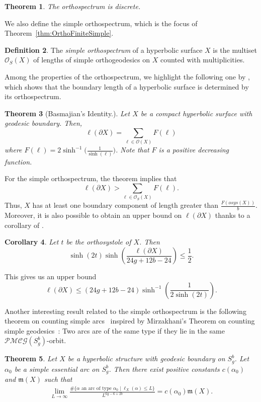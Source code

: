\documentclass[a4paper,12pt]{article}
\newtheorem{theorem}{Theorem}[section]
\newtheorem{corollaire}[theorem]{Corollary}
\theoremstyle{definition}
\newtheorem{definition}[theorem]{Definition}
\theoremstyle{remark}
\begin{document}
\begin{theorem}\label{thm:OrthoDiscrete}
    The orthospectrum is discrete.
\end{theorem}

We also define the simple orthospectrum, which is the focus of Theorem~\ref{thm:OrthoFiniteSimple}.

\begin{definition}
    The \emph{simple orthospectrum} of a hyperbolic surface $X$ is the multiset $\mathcal{O}_S(X)$ of lengths of simple orthogeodesics on $X$ counted with multiplicities.
\end{definition}



Among the properties of the orthospectrum, we highlight the following one by \cite{Basmajian}, which shows that the boundary length of a hyperbolic surface is determined by its orthospectrum. 

\begin{theorem}[Basmajian's Identity.]\label{theorem:perimetre}
    Let $X$ be a compact hyperbolic surface with geodesic boundary. Then,
    \[
        \ell (\partial X) = \sum_{\ell \in \mathcal{O}(X)} F(\ell)
    \]
    where $F(\ell)=2\sinh^{-1} \big( \frac{1}{\sinh (\ell)} \big)$. Note that $F$ is a positive decreasing function.
\end{theorem}

For the simple orthospectrum, the theorem implies that 
\[
    \ell (\partial X) > \sum_{\ell \in \mathcal{O}_S(X)} F(\ell).
\]
Thus, $X$ has at least one boundary component of length greater than $ \frac{F(osys(X))}{b}$. Moreover, it is also possible to obtain an upper bound on $\ell (\partial X)$ thanks to a corollary of \cite[Théorème~1]{Bavard}.

\begin{corollaire}\label{col:bavard}
    Let $t$ be the orthosystole of $X$. Then
    \[
        \sinh(2t)\sinh\left( \frac{\ell(\partial X)}{24g+12b-24}\right) \leqslant \frac{1}{2}.
    \]
    
\end{corollaire}
This gives us an upper bound
\[
    \ell(\partial X ) \leqslant (24g+12b-24) \sinh^{-1}\left( \frac{1}{2\sinh(2t)} \right).
\]

Another interesting result related to the simple orthospectrum is the following theorem on counting simple arcs~\cite{nickBell} inspired by Mirzakhani's Theorem on counting simple geodesics~\cite{mirzakhani}:
Two arcs are of the same type if they lie in the same $\mathcal{PMCG}(S_g^b)$-orbit.
\begin{theorem}\label{thm:comptageArc}
    Let $X$ be a hyperbolic structure with geodesic boundary on $S_g^b$. Let $\alpha_0$ be a simple essential arc on $S_g^b$. Then there exist positive constants $c(\alpha_0)$ and $\mathfrak{m}(X)$ such that
    \begin{align*}
        \lim_{L\to\infty}\frac{\# \{ \alpha \mbox{ an arc of type } \alpha_0 \mid \ell_X(\alpha) \leqslant L \}}{L^{6g-6+2b}}=c(\alpha_0)\mathfrak{m}(X).
    \end{align*}
\end{theorem}
\end{document}
